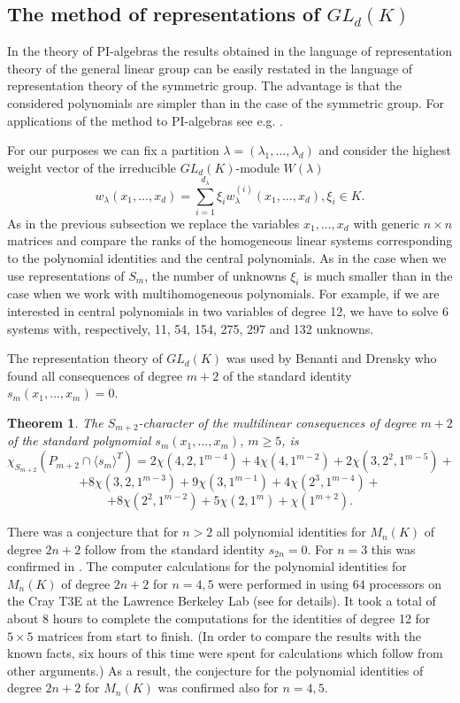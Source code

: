 \documentclass[12pt]{amsart}
\newtheorem{theorem}{Theorem}[section]
\theoremstyle{definition}
\begin{document}
\subsection{The method of representations of $GL_d(K)$}\label{the method of GL-representations}
In the theory of PI-algebras the results obtained in the language of representation theory of the general linear group
can be easily restated in the language of representation theory of the symmetric group.
The advantage is that the considered polynomials are simpler than in the case of the symmetric group.
For applications of the method to PI-algebras see e.g. \cite[Chapter 12]{Dr3}.

For our purposes we can fix a partition $\lambda=(\lambda_1,\ldots,\lambda_d)$ and consider
the highest weight vector of the irreducible $GL_d(K)$-module $W(\lambda)$
\[
w_{\lambda}(x_1,\ldots,x_d)=\sum_{i=1}^{d_{\lambda}}\xi_iw^{(i)}_{\lambda}(x_1,\ldots,x_d),\xi_i\in K.
\]
As in the previous subsection we replace the variables $x_1,\ldots,x_d$ with generic $n\times n$ matrices
and compare the ranks of the homogeneous linear systems corresponding to the polynomial identities and the central polynomials.
As in the case when we use representations of $S_m$, the number of unknowns $\xi_i$ is much smaller than
in the case when we work with multihomogeneous polynomials.
For example, if we are interested in central polynomials in two variables of degree 12,
we have to solve 6 systems with, respectively, 11, 54, 154, 275, 297 and 132 unknowns.

The representation theory of $GL_d(K)$ was used by Benanti and Drensky \cite{BenDr} who found all consequences of degree $m+2$
of the standard identity $s_m(x_1,\ldots,x_m)=0$.

\begin{theorem}\cite[Theorem 3.1]{BenDr}\label{Consequences of S_m}
The $S_{m+2}$-character of the
multilinear consequences of degree $m+2$ of
the standard polynomial $s_m(x_1,\ldots,x_m)$, $m\geq 5$, is
\[
\chi_{S_{m+2}}(P_{m+2}\cap\langle s_m\rangle^T)=
2\chi(4,2,1^{m-4})+4\chi(4,1^{m-2})+2\chi(3,2^2,1^{m-5})+
\]
\[
+8\chi(3,2,1^{m-3})+9\chi(3,1^{m-1})+4\chi(2^3,1^{m-4})+
\]
\[
+8\chi(2^2,1^{m-2})+5\chi(2,1^m)+\chi(1^{m+2}).
\]
\end{theorem}

There was a conjecture that for $n>2$ all polynomial identities for $M_n(K)$ of degree $2n+2$
follow from the standard identity $s_{2n}=0$.
For $n=3$ this was confirmed in \cite{DrKas1}.
The computer calculations for the polynomial identities for $M_n(K)$ of degree $2n+2$ for $n=4,5$
were performed in \cite{BenDeDrKo1} using $64$ processors on the Cray T3E at the Lawrence Berkeley Lab
(see \cite{BenDeDrKo2} for details).
It took a total of about $8$ hours to complete
the computations for the identities of degree 12
for $5\times 5$ matrices from start to finish.
(In order to compare the results with the known facts,
six hours of this time were spent for calculations which follow from
other arguments.) As a result, the conjecture for the polynomial identities of degree $2n+2$ for $M_n(K)$ was confirmed also for $n=4,5$.
\end{document}
